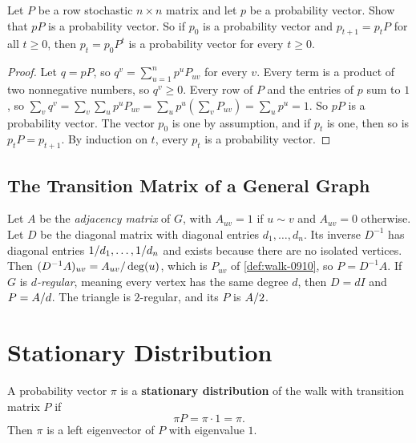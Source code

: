 \begin{exercisebox}
\begin{exercise}\label{ex:probvec-0910}\label{thm:probvec-0910}
    Let $P$ be a row stochastic $n \times n$ matrix and let $p$ be a probability vector. Show that
    $pP$ is a probability vector. So if $p_0$ is a probability vector and $p_{t+1} = p_t P$ for all
    $t \geq 0$, then $p_t = p_0 P^t$ is a probability vector for every $t \geq 0$.
\end{exercise}
\tcblower
\begin{proof}
    Let $q = pP$, so $q^v = \sum_{u=1}^{n} p^u P_{uv}$ for every $v$. Every term is a product of
    two nonnegative numbers, so $q^v \geq 0$. Every row of $P$ and the entries of $p$ sum to $1$, so
    $\sum_{v} q^v = \sum_{v} \sum_{u} p^u P_{uv} = \sum_{u} p^u \left(\sum_{v} P_{uv}\right)
        = \sum_{u} p^u = 1$.
    So $pP$ is a probability vector. The vector $p_0$ is one by assumption, and if $p_t$ is one,
    then so is $p_t P = p_{t+1}$. By induction on $t$, every $p_t$ is a probability vector.
\end{proof}
\end{exercisebox}

\subsection{The Transition Matrix of a General Graph}

Let $A$ be the \emph{adjacency matrix} of $G$, with $A_{uv} = 1$ if $u \sim v$ and $A_{uv} = 0$
otherwise. Let $D$ be the diagonal matrix with diagonal entries $d_1, \dots, d_n$. Its inverse
$D^{-1}$ has diagonal entries $1/d_1, \dots, 1/d_n$ and exists because there are
no isolated vertices. Then $(D^{-1} A)_{uv} = A_{uv}/\deg(u)$, which is $P_{uv}$ of
\cref{def:walk-0910}, so $P = D^{-1} A$.
If $G$ is \emph{$d$-regular}, meaning every vertex has the same degree $d$, then $D = d I$ and
$P = A/d$. The triangle is $2$-regular, and its $P$ is $A/2$.

\section{Stationary Distribution}

\begin{definition}\label{def:stationary-0910}
    A probability vector $\pi$ is a \textbf{stationary distribution} of the walk with transition matrix $P$
    if
    \[\pi P = \pi \cdot 1 = \pi.\]
    Then $\pi$ is a left eigenvector of $P$ with eigenvalue $1$.
\end{definition}

